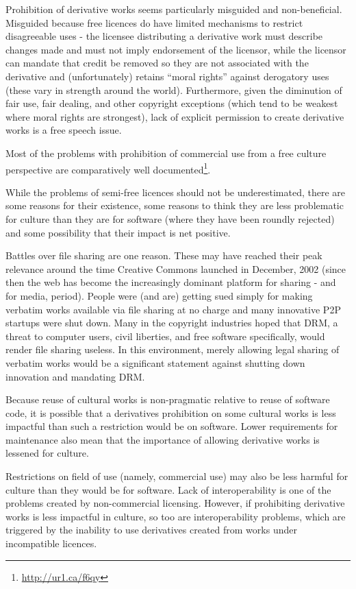 Prohibition of derivative works seems particularly misguided and
non-benef\hbox{}icial.  Misguided because free licences do have limited
mechanisms to restrict disagreeable uses - the licensee distributing a
derivative work must describe changes made and must not imply endorsement of the
licensor, while the licensor can mandate that credit be removed so they are not
associated with the derivative and (unfortunately) retains ``moral rights''
against derogatory uses (these vary in strength around the world). Furthermore,
given the diminution of fair use, fair dealing, and other copyright exceptions
(which tend to be weakest where moral rights are strongest), lack of explicit
permission to create derivative works is a free speech issue.

Most of the problems with prohibition of commercial use from a free culture
perspective are comparatively well
documented\footnote{\url{http://ur1.ca/f6qy}}.

While the problems of semi-free licences should not be underestimated, there are
some reasons for their existence, some reasons to think they are less
problematic for culture than they are for software (where they have been roundly
rejected) and some possibility that their impact is net positive.

Battles over f\hbox{}ile sharing are one reason. These may have reached their
peak relevance around the time Creative Commons launched in December, 2002
(since then the web has become the increasingly dominant platform for sharing -
and for media, period). People were (and are) getting sued simply for making
verbatim works available via f\hbox{}ile sharing at no charge and many
innovative P2P startups were shut down. Many in the copyright industries hoped
that DRM, a threat to computer users, civil liberties, and free software
specif\hbox{}ically, would render f\hbox{}ile sharing useless. In this
environment, merely allowing legal sharing of verbatim works would be a
signif\hbox{}icant statement against shutting down innovation and mandating DRM.

Because reuse of cultural works is non-pragmatic relative to reuse of software
code, it is possible that a derivatives prohibition on some cultural works is
less impactful than such a restriction would be on software. Lower requirements
for maintenance also mean that the importance of allowing derivative works is
lessened for culture.

Restrictions on f\hbox{}ield of use (namely, commercial use) may also be less
harmful for culture than they would be for software. Lack of interoperability is
one of the problems created by non-commercial licensing. However, if prohibiting
derivative works is less impactful in culture, so too are interoperability
problems, which are triggered by the inability to use derivatives created from
works under incompatible licences.

